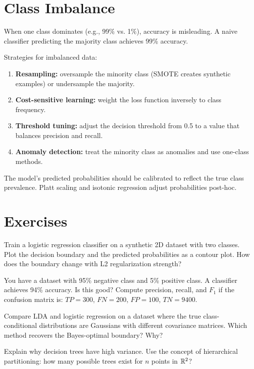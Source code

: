 \section{Class Imbalance}

When one class dominates (e.g., 99\% vs. 1\%), accuracy is misleading. A naive classifier predicting the majority class achieves 99\% accuracy.

Strategies for imbalanced data:

\begin{enumerate}
	\item \textbf{Resampling:} oversample the minority class (SMOTE creates synthetic examples) or undersample the majority.
	\item \textbf{Cost-sensitive learning:} weight the loss function inversely to class frequency.
	\item \textbf{Threshold tuning:} adjust the decision threshold from 0.5 to a value that balances precision and recall.
	\item \textbf{Anomaly detection:} treat the minority class as anomalies and use one-class methods.
\end{enumerate}

\begin{principle}
	The model's predicted probabilities should be calibrated to reflect the true class prevalence. Platt scaling and isotonic regression adjust probabilities post-hoc.
\end{principle}

\section{Exercises}

\begin{exercise}
	Train a logistic regression classifier on a synthetic 2D dataset with two classes. Plot the decision boundary and the predicted probabilities as a contour plot. How does the boundary change with L2 regularization strength?
\end{exercise}

\begin{exercise}
	You have a dataset with 95\% negative class and 5\% positive class. A classifier achieves 94\% accuracy. Is this good? Compute precision, recall, and $F_1$ if the confusion matrix is: $TP = 300$, $FN = 200$, $FP = 100$, $TN = 9400$.
\end{exercise}

\begin{exercise}
	Compare LDA and logistic regression on a dataset where the true class-conditional distributions are Gaussians with different covariance matrices. Which method recovers the Bayes-optimal boundary? Why?
\end{exercise}

\begin{exercise}
	Explain why decision trees have high variance. Use the concept of hierarchical partitioning: how many possible trees exist for $n$ points in $\mathbb{R}^2$?
\end{exercise}
